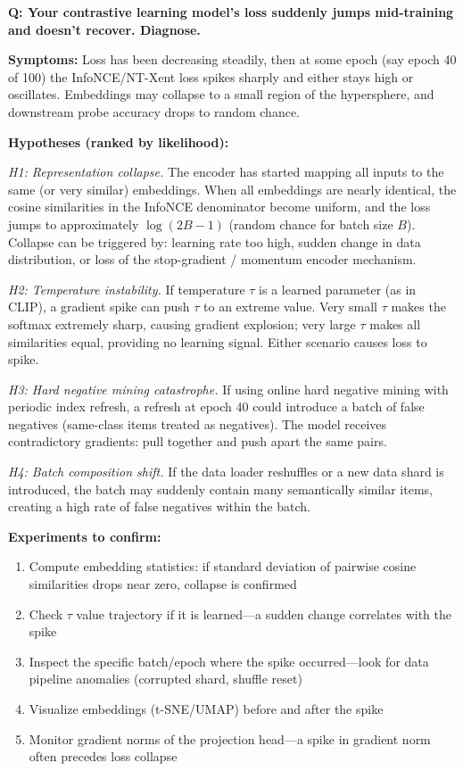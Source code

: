 \begin{interviewq}
\textbf{Q: Your contrastive learning model's loss suddenly jumps mid-training and doesn't recover. Diagnose.}

 \quad {} \quad \badgefreq{\freqlow}

\stronganswer

\textbf{Symptoms:} Loss has been decreasing steadily, then at some epoch (say epoch 40 of 100) the InfoNCE/NT-Xent loss spikes sharply and either stays high or oscillates. Embeddings may collapse to a small region of the hypersphere, and downstream probe accuracy drops to random chance.

\textbf{Hypotheses (ranked by likelihood):}

\textit{H1: Representation collapse.} The encoder has started mapping all inputs to the same (or very similar) embeddings. When all embeddings are nearly identical, the cosine similarities in the InfoNCE denominator become uniform, and the loss jumps to approximately $\log(2B-1)$ (random chance for batch size $B$). Collapse can be triggered by: learning rate too high, sudden change in data distribution, or loss of the stop-gradient / momentum encoder mechanism.

\textit{H2: Temperature instability.} If temperature $\tau$ is a learned parameter (as in CLIP), a gradient spike can push $\tau$ to an extreme value. Very small $\tau$ makes the softmax extremely sharp, causing gradient explosion; very large $\tau$ makes all similarities equal, providing no learning signal. Either scenario causes loss to spike.

\textit{H3: Hard negative mining catastrophe.} If using online hard negative mining with periodic index refresh, a refresh at epoch 40 could introduce a batch of false negatives (same-class items treated as negatives). The model receives contradictory gradients: pull together and push apart the same pairs.

\textit{H4: Batch composition shift.} If the data loader reshuffles or a new data shard is introduced, the batch may suddenly contain many semantically similar items, creating a high rate of false negatives within the batch.

\textbf{Experiments to confirm:}
\begin{enumerate}
    \item Compute embedding statistics: if standard deviation of pairwise cosine similarities drops near zero, collapse is confirmed
    \item Check $\tau$ value trajectory if it is learned---a sudden change correlates with the spike
    \item Inspect the specific batch/epoch where the spike occurred---look for data pipeline anomalies (corrupted shard, shuffle reset)
    \item Visualize embeddings (t-SNE/UMAP) before and after the spike
    \item Monitor gradient norms of the projection head---a spike in gradient norm often precedes loss collapse
\end{enumerate}


\end{interviewq}
